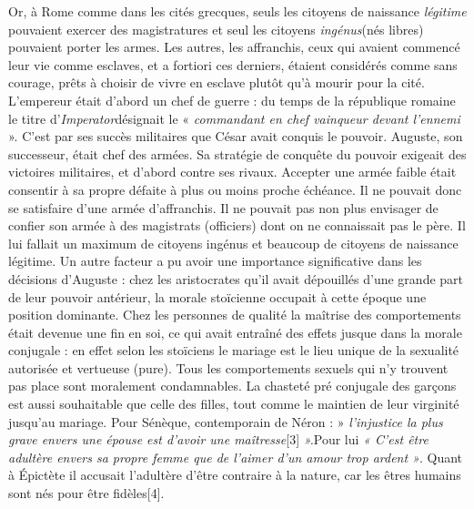  Or, à Rome comme dans les cités grecques, seuls les citoyens de naissance \emph{légitime} pouvaient exercer des magistratures et seul les citoyens \emph{ingénus}(nés libres) pouvaient porter les armes. Les autres, les affranchis, ceux qui avaient commencé leur vie comme esclaves, et a fortiori ces derniers, étaient considérés comme sans courage, prêts à choisir de vivre en esclave plutôt qu'à mourir pour la cité. 
 L'empereur était d'abord un chef de guerre : du temps de la république romaine le titre d'\emph{Imperator}désignait le « \emph{commandant en chef vainqueur devant l'ennemi} ». C'est par ses succès militaires que César avait conquis le pouvoir. Auguste, son successeur, était chef des armées. Sa stratégie de conquête du pouvoir exigeait des victoires militaires, et d'abord contre ses rivaux. Accepter une armée faible était consentir à sa propre défaite à plus ou moins proche échéance. Il ne pouvait donc se satisfaire d'une armée d'affranchis. Il ne pouvait pas non plus envisager de confier son armée à des magistrats (officiers) dont on ne connaissait pas le père. Il lui fallait un maximum de citoyens ingénus et beaucoup de citoyens de naissance légitime. 
 Un autre facteur a pu avoir une importance significative dans les décisions d'Auguste : chez les aristocrates qu'il avait dépouillés d'une grande part de leur pouvoir antérieur, la morale stoïcienne occupait à cette époque une position dominante. Chez les personnes de qualité la maîtrise des comportements était devenue une fin en soi, ce qui avait entraîné des effets jusque dans la morale conjugale : en effet selon les stoïciens le mariage est le lieu unique de la sexualité autorisée et vertueuse (pure). Tous les comportements sexuels qui n'y trouvent pas place sont moralement condamnables. La chasteté pré conjugale des garçons est aussi souhaitable que celle des filles, tout comme le maintien de leur virginité jusqu'au mariage. Pour Sénèque, contemporain de Néron : » \emph{l'injustice la plus grave envers une épouse est d'avoir une maîtresse}[3]\emph{ ».}Pour lui \emph{« C'est être adultère envers sa propre femme que de l'aimer d'un amour trop ardent »}. Quant à Épictète il accusait l'adultère d'être contraire à la nature, car les êtres humains sont nés pour être fidèles[4]. 
